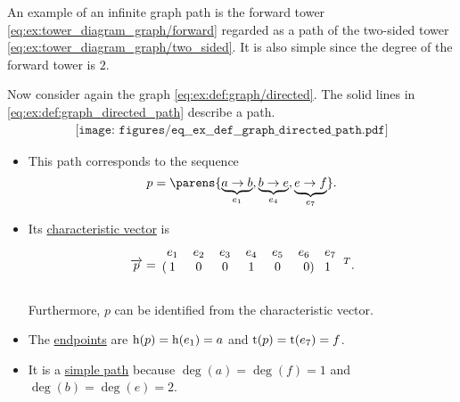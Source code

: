 \begin{example}\label{ex:def:graph_directed_path}
  An example of an infinite graph path is the forward tower \eqref{eq:ex:tower_diagram_graph/forward} regarded as a path of the two-sided tower \eqref{eq:ex:tower_diagram_graph/two_sided}. It is also simple since the degree of the forward tower is \( 2 \).

  Now consider again the graph \eqref{eq:ex:def:graph/directed}. The solid lines in \eqref{eq:ex:def:graph_directed_path} describe a path.
  \begin{equation}\label{eq:ex:def:graph_directed_path}
    \begin{aligned}
      \texttt{[image: figures/eq\_\_ex\_\_def\_\_graph\_directed\_path.pdf]}
    \end{aligned}
  \end{equation}

  \begin{itemize}
    \item This path corresponds to the sequence
    \begin{equation*}
      p = \parens{ \underbrace{a \to b}_{e_1}, \underbrace{b \to e}_{e_4}, \underbrace{e \to f}_{e_7} }.
    \end{equation*}

    \item Its \hyperref[def:graph_directed_path/characteristic_vector]{characteristic vector} is
    \begin{equation*}
      \vect{p}
      =
      \begin{blockarray}{cccccrl}
        e_1 & e_2 & e_3 & e_4 & e_5 & e_6 & e_7 \\
      \begin{block}{(cccccr)l}
        1   & 0   & 0   & 1   & 0   & 0   & 1 \\
      \end{block}
      \end{blockarray}
      {}^T.
    \end{equation*}

    Furthermore, \( p \) can be identified from the characteristic vector.

    \item The \hyperref[def:graph_directed_path/endpoints]{endpoints} are \( \operatorname{h}(p) = \operatorname{h}(e_1) = a \) and \( \operatorname{t}(p) = \operatorname{t}(e_7) = f \).

    \item It is a \hyperref[def:graph_adjacency_chain/simple]{simple path} because \( \deg(a) = \deg(f) = 1 \) and \( \deg(b) = \deg(e) = 2 \).


\end{itemize}
\end{example}
